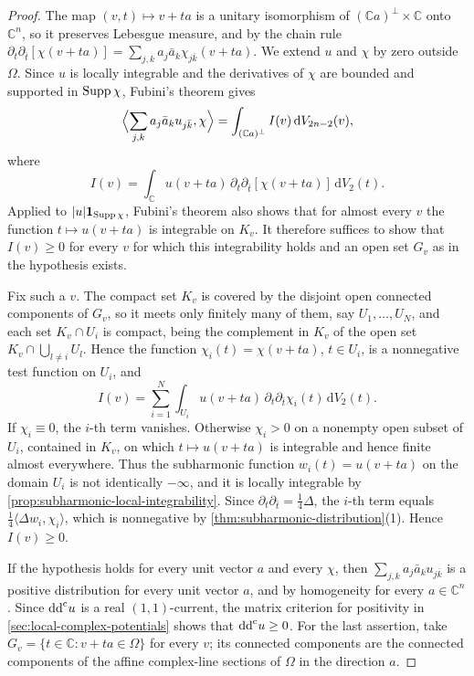 \begin{proof}
The map $(v,t)\mapsto v+ta$ is a unitary isomorphism of $(\mathbb{C}a)^\perp\times\mathbb{C}$ onto $\mathbb{C}^n$, so it preserves Lebesgue measure, and by the chain rule $\partial_t\partial_{\bar t}[\chi(v+ta)]=\sum_{j,k}a_j\bar a_k\chi_{j\bar k}(v+ta)$. We extend $u$ and $\chi$ by zero outside $\Omega$. Since $u$ is locally integrable and the derivatives of $\chi$ are bounded and supported in $\operatorname{Supp}\chi$, Fubini's theorem gives
\[
 \Bigl\langle\sum_{j,k}a_j\bar a_ku_{j\bar k},\chi\Bigr\rangle
 =\int_{(\mathbb{C}a)^\perp}I(v)\,\mathrm{d}V_{2n-2}(v),
\]
where
\[
 I(v)=\int_{\mathbb{C}}u(v+ta)\,\partial_t\partial_{\bar t}[\chi(v+ta)]\,\mathrm{d}V_2(t).
\]
Applied to $|u|\mathbf1_{\operatorname{Supp}\chi}$, Fubini's theorem also shows that for almost every $v$ the function $t\mapsto u(v+ta)$ is integrable on $K_v$. It therefore suffices to show that $I(v)\geq0$ for every $v$ for which this integrability holds and an open set $G_v$ as in the hypothesis exists.

Fix such a $v$. The compact set $K_v$ is covered by the disjoint open connected components of $G_v$, so it meets only finitely many of them, say $U_1,\ldots,U_N$, and each set $K_v\cap U_i$ is compact, being the complement in $K_v$ of the open set $K_v\cap\bigcup_{l\neq i}U_l$. Hence the function $\chi_i(t)=\chi(v+ta)$, $t\in U_i$, is a nonnegative test function on $U_i$, and
\[
 I(v)=\sum_{i=1}^N\int_{U_i}u(v+ta)\,\partial_t\partial_{\bar t}\chi_i(t)\,\mathrm{d}V_2(t).
\]
If $\chi_i\equiv0$, the $i$-th term vanishes. Otherwise $\chi_i>0$ on a nonempty open subset of $U_i$, contained in $K_v$, on which $t\mapsto u(v+ta)$ is integrable and hence finite almost everywhere. Thus the subharmonic function $w_i(t)=u(v+ta)$ on the domain $U_i$ is not identically $-\infty$, and it is locally integrable by \cref{prop:subharmonic-local-integrability}. Since $\partial_t\partial_{\bar t}=\frac14\Delta$, the $i$-th term equals $\frac14\langle\Delta w_i,\chi_i\rangle$, which is nonnegative by \cref{thm:subharmonic-distribution}(1). Hence $I(v)\geq0$.

If the hypothesis holds for every unit vector $a$ and every $\chi$, then $\sum_{j,k}a_j\bar a_ku_{j\bar k}$ is a positive distribution for every unit vector $a$, and by homogeneity for every $a\in\mathbb{C}^n$. Since $\mathrm{dd}^{\mathrm{c}} u$ is a real $(1,1)$-current, the matrix criterion for positivity in \cref{sec:local-complex-potentials} shows that $\mathrm{dd}^{\mathrm{c}} u\geq0$. For the last assertion, take $G_v=\{t\in\mathbb{C}:v+ta\in\Omega\}$ for every $v$; its connected components are the connected components of the affine complex-line sections of $\Omega$ in the direction $a$.
\end{proof}

